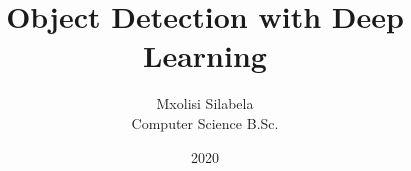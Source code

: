 \title{Object Detection with Deep Learning}
\author{Mxolisi Silabela \\ Computer Science B.Sc.}
\date{2020}
